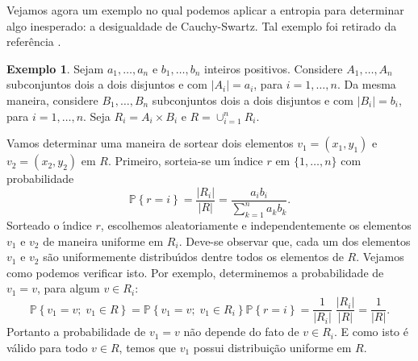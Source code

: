 \documentclass{amsart}
\theoremstyle{theorem}
\theoremstyle{definition}
\newtheorem{ex}{Exemplo}[section]
\theoremstyle{remark}
\numberwithin{equation}{section}
\newcommand{\PP}[1]{\mathbb{P}\left\{ #1 \right\}}
\begin{document}
Vejamos agora um exemplo no qual podemos aplicar a entropia para determinar algo inesperado: a desigualdade de Cauchy-Swartz. Tal exemplo foi retirado da refer\^{e}ncia \cite{}.

\begin{ex}
  Sejam $a_1,\ldots,a_n$ e $b_1,\ldots,b_n$ inteiros positivos. Considere $A_1,\ldots,A_n$ subconjuntos dois a dois disjuntos e com $|A_i| = a_i$, para $i = 1,\ldots,n$. Da mesma maneira, considere $B_1,\ldots,B_n$ subconjuntos dois a dois disjuntos e com $|B_i| = b_i$, para $i = 1,\ldots,n$. Seja $R_i = A_i\times B_i$ e $R = \cup_{i=1}^{n} R_i$.
%
%


    Vamos determinar uma maneira de sortear dois elementos $v_1=(x_1,y_1)$ e $v_2=(x_2,y_2)$ em $R$. Primeiro, sorteia-se um \'{\i}ndice $r$ em $\{1,\ldots,n\}$ com probabilidade
    \begin{equation*}
      \PP{r=i} = \frac{|R_i|}{|R|} = \frac{a_i b_i}{\sum_{k=1}^{n} a_k b_k}.
    \end{equation*}
    Sorteado o \'{\i}ndice $r$, escolhemos aleatoriamente e independentemente os elementos $v_1$ e $v_2$ de maneira uniforme em $R_i$. Deve-se observar que, cada um dos elementos $v_1$ e $v_2$ s\~{a}o uniformemente distribu\'{\i}dos dentre todos os elementos de $R$. Vejamos como podemos verificar isto. Por exemplo, determinemos a probabilidade de $v_1 = v$, para algum $v\in R_i$:
    \begin{equation*}
      \PP{v_1 = v;\; v_1\in R} =  \PP{v_1 = v;\; v_1 \in R_i} \PP{r=i} = \frac{1}{|R_i|}\; \frac{|R_i|}{|R|} = \frac{1}{|R|}.
    \end{equation*}
    Portanto a probabilidade de $v_1 = v$ n\~{a}o depende do fato de $v \in R_i$. E como isto \'{e} v\'{a}lido para todo $v\in R$, temos que $v_1$ possui distribui\c{c}\~{a}o uniforme em $R$.


\end{ex}
\end{document}
